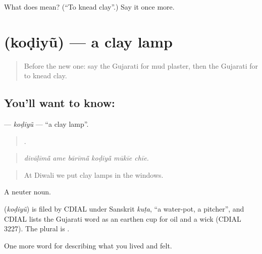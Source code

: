 \begin{tcolorbox}[breakable,colback=teal!4,colframe=teal!35!black,title={Before you move on}]
What does  mean? (\textquotedblleft{}To knead clay\textquotedblright{}.) Say it once more.
\end{tcolorbox}
\section[\texorpdfstring{\gu{કોડિયું} (koḍiyũ)}{કોડિયું (koḍiyũ)}]{ (koḍiyũ) — a clay lamp}

\label{lesson:GU-C504-kodiyu}



\begin{quote}
Before the new one: say the Gujarati for mud plaster, then the Gujarati for to knead clay.
\end{quote}

\subsection*{You'll want to know: }
\textbf{} — \emph{koḍiyũ} — \textquotedblleft{}a clay lamp\textquotedblright{}.

\begin{quote}
     .
\end{quote}

\begin{quote}
\emph{divāḷīmā̃ ame bārīmā̃ koḍiyā̃ mūkīe chīe.}
\end{quote}

\begin{quote}
At Diwali we put clay lamps in the windows.
\end{quote}

A neuter noun.

\begin{cousinweb}
\textbf{} (\emph{koḍiyũ}) is filed by CDIAL under Sanskrit \emph{kuṭa}, \textquotedblleft{}a water-pot, a pitcher\textquotedblright{}, and CDIAL lists the Gujarati word as an earthen cup for oil and a wick (CDIAL 3227). The plural is \textbf{}.
\end{cousinweb}

\begin{grammarlens}[title={What you've built}]
One more word for describing what you lived and felt.
\end{grammarlens}

